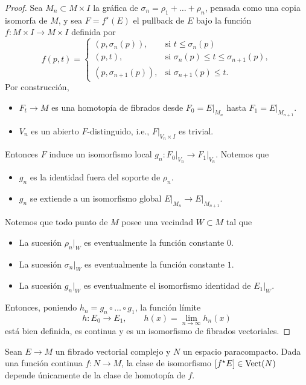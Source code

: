 \begin{proof}
Sea $M_n \subset M \times I$ la gráfica de $\sigma_n = \rho_1 + \dots + \rho_n$, pensada como una copia isomorfa de $M$, y sea $F = f^\star(E)$ el pullback de $E$ bajo la función $f : M \times I \to M \times I$ definida por
$$
f(p,t) =
  \begin{cases}
    (p, \sigma_n(p)),     & \text{si } t \le \sigma_n(p) \\
    (p, t),               & \text{si } \sigma_n(p) \le t \le \sigma_{n+1}(p), \\
    (p, \sigma_{n+1}(p)), & \text{si } \sigma_{n+1}(p) \le t.
  \end{cases}
$$
Por construcción,
\begin{itemize}
    \itemsep 0em
    \item $F_t \to M$ es una homotopía de fibrados desde $F_0 = E \vert_{M_n}$ hasta $F_1 = E \vert_{M_{n+1}}$.
    \item $V_n$ es un abierto $F$-distinguido, i.e., $F \vert_{V_n \times I}$ es trivial.
\end{itemize}
Entonces $F$ induce un isomorfismo local $g_n : F_0 \vert_{V_n} \to F_1 \vert_{V_n}$. Notemos que
\begin{itemize}
    \item $g_n$ es la identidad fuera del soporte de $\rho_n$.
    \item $g_n$ se extiende a un isomorfismo global $E \vert_{M_n} \to E \vert_{M_{n+1}}$.
\end{itemize}
Notemos que todo punto de $M$ posee una vecindad $W \subset M$ tal que
\begin{itemize}
    \itemsep 0em
    \item La sucesión $\rho_n \vert_W$ es eventualmente la función constante $0$.
    \item La sucesión $\sigma_n \vert_W$ es eventualmente la función constante $1$.
    \item La sucesión $g_n \vert_W$ es eventualmente el isomorfismo identidad de $E_1 \vert_W$.
\end{itemize}
Entonces, poniendo $h_n = g_n \circ \dots \circ g_1$, la función límite
$$h : E_0 \longrightarrow E_1, \qquad h(x) = \lim_{n \to \infty} h_n(x)$$
está bien definida, es continua y es un isomorfismo de fibrados vectoriales.
\end{proof}

\begin{corollary}
Sean $E \to M$ un fibrado vectorial complejo y $N$ un espacio paracompacto. Dada una función continua $f : N \to M$, la clase de isomorfismo $[f^\star E] \in \operatorname{Vect}(N)$ depende únicamente de la clase de homotopía de $f$.
\end{corollary}

